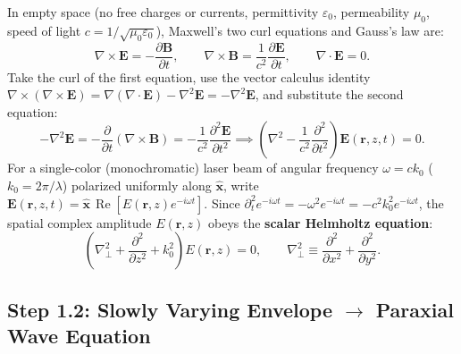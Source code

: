 \documentclass[10pt,letterpaper]{article}
\numberwithin{equation}{section}
\begin{document}
In empty space (no free charges or currents, permittivity $\varepsilon_0$, permeability $\mu_0$, speed of light $c = 1/\sqrt{\mu_0\varepsilon_0}$), Maxwell's two curl equations and Gauss's law are:
\begin{equation}
  \nabla\times\mathbf{E} = -\frac{\partial\mathbf{B}}{\partial t}, \qquad
  \nabla\times\mathbf{B} = \frac{1}{c^2}\frac{\partial\mathbf{E}}{\partial t}, \qquad
  \nabla\cdot\mathbf{E} = 0.
\end{equation}
Take the curl of the first equation, use the vector calculus identity $\nabla\times(\nabla\times\mathbf{E}) = \nabla(\nabla\cdot\mathbf{E}) - \nabla^2\mathbf{E} = -\nabla^2\mathbf{E}$, and substitute the second equation:
\begin{equation}
  -\nabla^2\mathbf{E} = -\frac{\partial}{\partial t}(\nabla\times\mathbf{B}) = -\frac{1}{c^2}\frac{\partial^2\mathbf{E}}{\partial t^2}
  \implies \left(\nabla^2 - \frac{1}{c^2}\frac{\partial^2}{\partial t^2}\right)\mathbf{E}(\mathbf{r},z,t) = 0.
\end{equation}
For a single-color (monochromatic) laser beam of angular frequency $\omega = c k_0$ ($k_0 = 2\pi/\lambda$) polarized uniformly along $\hat{\mathbf{x}}$, write $\mathbf{E}(\mathbf{r},z,t) = \hat{\mathbf{x}}\,\operatorname{Re}[E(\mathbf{r},z)e^{-i\omega t}]$. Since $\partial_t^2 e^{-i\omega t} = -\omega^2 e^{-i\omega t} = -c^2 k_0^2 e^{-i\omega t}$, the spatial complex amplitude $E(\mathbf{r},z)$ obeys the \textbf{scalar Helmholtz equation}:
\begin{equation}
  \left(\nabla_\perp^2 + \frac{\partial^2}{\partial z^2} + k_0^2\right)E(\mathbf{r},z) = 0, \qquad \nabla_\perp^2 \equiv \frac{\partial^2}{\partial x^2} + \frac{\partial^2}{\partial y^2}.
  \label{eq:c1_helmholtz}
\end{equation}

\subsection{Step 1.2: Slowly Varying Envelope $\to$ Paraxial Wave Equation}
\end{document}

